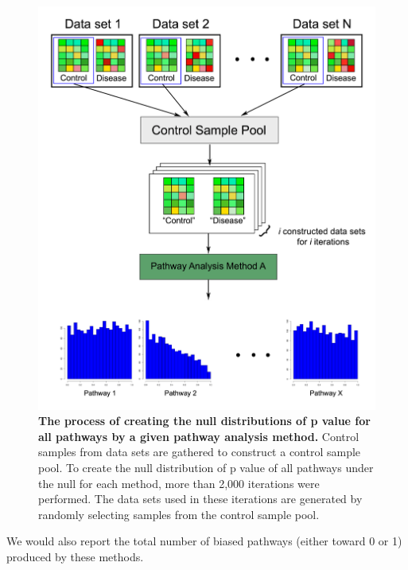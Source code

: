 \begin{figure}
\centering
	\includegraphics[width=0.8\linewidth]{Figures/Fig4}
  \caption{\textbf{The process of creating the null distributions of p value for all pathways by a given pathway analysis method.} Control samples from data sets are  gathered to construct a control sample pool. To create the null distribution of p value of all pathways under the null for each method, more than 2,000 iterations were performed. The data sets used in these iterations are generated by randomly selecting samples from the control sample pool.}
  \label{nullGeneration}
\end{figure}

We would also report the total number of biased pathways  (either toward 0 or 1) produced by these methods.

%

